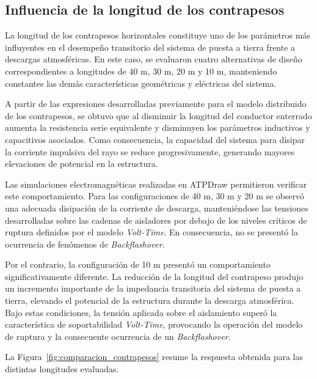 \documentclass[12pt,letterpaper]{article}
\begin{document}
\subsection{Influencia de la longitud de los contrapesos}

La longitud de los contrapesos horizontales constituye uno de los parámetros más influyentes en el desempeño transitorio del sistema de puesta a tierra frente a descargas atmosféricas. En este caso, se evaluaron cuatro alternativas de diseño correspondientes a longitudes de 40 m, 30 m, 20 m y 10 m, manteniendo constantes las demás características geométricas y eléctricas del sistema.

A partir de las expresiones desarrolladas previamente para el modelo distribuido de los contrapesos, se obtuvo que al disminuir la longitud del conductor enterrado aumenta la resistencia serie equivalente y disminuyen los parámetros inductivos y capacitivos asociados. Como consecuencia, la capacidad del sistema para disipar la corriente impulsiva del rayo se reduce progresivamente, generando mayores elevaciones de potencial en la estructura.

Las simulaciones electromagnéticas realizadas en ATPDraw permitieron verificar este comportamiento. Para las configuraciones de 40 m, 30 m y 20 m se observó una adecuada disipación de la corriente de descarga, manteniéndose las tensiones desarrolladas sobre las cadenas de aisladores por debajo de los niveles críticos de ruptura definidos por el modelo \textit{Volt-Time}. En consecuencia, no se presentó la ocurrencia de fenómenos de \textit{Backflashover}.

Por el contrario, la configuración de 10 m presentó un comportamiento significativamente diferente. La reducción de la longitud del contrapeso produjo un incremento importante de la impedancia transitoria del sistema de puesta a tierra, elevando el potencial de la estructura durante la descarga atmosférica. Bajo estas condiciones, la tensión aplicada sobre el aislamiento superó la característica de soportabilidad \textit{Volt-Time}, provocando la operación del modelo de ruptura y la consecuente ocurrencia de un \textit{Backflashover}.

La Figura~\ref{fig:comparacion_contrapesos} resume la respuesta obtenida para las distintas longitudes evaluadas.
\end{document}
